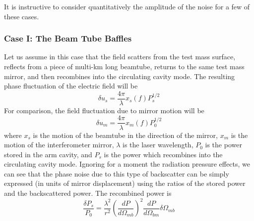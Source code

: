 It is instructive to consider quantitatively the amplitude of the noise for a few of
these cases.
\subsubsection{Case I: The Beam Tube Baffles}
Let us assume in this case that the field scatters from the test mass surface,
reflects from a piece of multi-km long beamtube, returns to the same test mass
mirror, and then recombines into the circulating cavity mode. The resulting phase
fluctuation of the electric field will be
\begin{equation}
\delta u_{s} = \frac{4 \pi}{\lambda} x_{s}(f) P_s^{1/2}
\end{equation}
For comparison, the field fluctuation due to mirror motion will be
\begin{equation}
\delta u_{m} = \frac{4 \pi}{\lambda} x_{m}(f) P_0^{1/2}
\end{equation}
where $x_s$ is the motion of the beamtube in the direction of the mirror, $x_m$
is the motion of the interferometer mirror, $\lambda$ is the laser wavelength,
$P_0$ is the power stored in the arm cavity, and $P_s$ is the power which
recombines into the circulating cavity mode. Ignoring for a moment the radiation
pressure effects, we can see that the phase noise due to this type of backscatter
can be simply expressed (in units of mirror displacement) using the ratios of
the stored power and the backscattered power. The recombined power is
\begin{equation}
\frac{\delta P_s}{P_0} = \frac{\lambda^2}{r^2} \left( \frac{dP}{d\Omega_{mb}}\right)^2 \frac{dP}{d\Omega_{bm}} \delta \Omega_{mb}
\end{equation}


